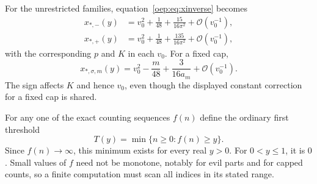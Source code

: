 \documentclass[11pt,letterpaper]{article}
\theoremstyle{remark}\newtheorem{remark}[theorem]{Remark}
\newcommand{\OO}{\mathcal O}
\begin{document}
For the unrestricted families, equation~\eqref{oep:eq:xinverse} becomes
\begin{align}
 x_{*,-}(y)&=v_0^2+\frac1{48}+\frac{15}{16\pi^2}+\OO(v_0^{-1}),\label{oep:eq:inverseodious}\\
 x_{*,+}(y)&=v_0^2+\frac1{48}+\frac{135}{16\pi^2}+\OO(v_0^{-1}),\label{oep:eq:inverseevil}
\end{align}
with the corresponding $p$ and $K$ in each $v_0$. For a fixed cap,
\begin{equation}\label{oep:eq:inversecapped}
 x_{*,\sigma,m}(y)=v_0^2-\frac m{48}+\frac{3}{16a_m}+\OO(v_0^{-1}).
\end{equation}
The sign affects $K$ and hence $v_0$, even though the displayed constant correction for a fixed cap is shared.

For any one of the exact counting sequences $f(n)$ define the ordinary first threshold
\begin{equation}\label{oep:eq:threshold}
 T(y)=\min\{n\geq0:f(n)\geq y\}.
\end{equation}
Since $f(n)\to\infty$, this minimum exists for every real $y>0$. For $0<y\leq1$, it is $0$. Small values of $f$ need not be monotone, notably for evil parts and for capped counts, so a finite computation must scan all indices in its stated range.
\end{document}
